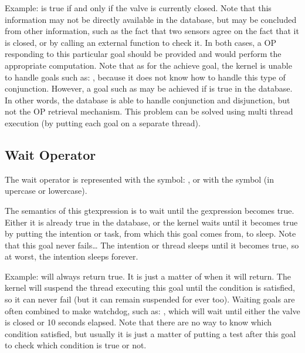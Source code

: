 Example:  is true if and only if the valve is
currently closed. Note that this information may not be directly available in
the database, but may be concluded from other information, such as the fact
that two sensors agree on the fact that it is closed, or by calling an external
function to check it. In both cases, a OP responding to this particular goal
should be provided and would perform the appropriate computation. Note that as
for the achieve goal, the kernel is unable to handle goals such as: , because it does not know
how to handle this type of conjunction. However, a goal such as  may be achieved if  is true in the database. In other
words, the database is able to handle conjunction and disjunction, but not the
OP retrieval mechanism. This problem can be solved using multi thread
execution (by putting each goal on a separate thread).

\subsection{Wait Operator}

The wait operator is represented with the symbol: \samp{\^{}}, or with the
symbol  (in upercase or lowercase).

The semantics of this gtexpression is to wait until the gexpression becomes
true. Either it is already true in the database, or the kernel waits until it
becomes true by putting the intention or task, from which this goal comes from,
to sleep.  Note that this goal never fails\dots{} The intention or thread
sleeps until it becomes true, so at worst, the intention sleeps forever.

Example:  will always return true. It is just
a matter of when it will return. The kernel will suspend the thread executing
this goal until the condition is satisfied, so it can never fail (but it can
remain suspended for ever too). Waiting goals are often combined to make
watchdog, such as: , which will wait until either the valve is closed or 10 seconds elapsed.
Note that there are no way to know which condition satisfied, but usually it is
just a matter of putting a test after this goal to check which condition is
true or not.

